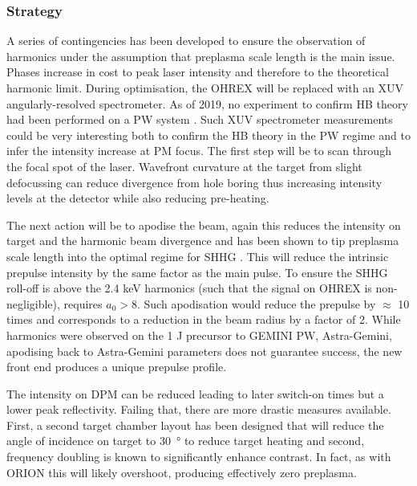 \subsubsection{Strategy}
A series of contingencies has been developed to ensure the observation of harmonics under the assumption that preplasma scale length is the main issue. Phases increase in cost to peak laser intensity and therefore to the theoretical harmonic limit. During optimisation, the OHREX will be replaced with an XUV angularly-resolved spectrometer. As of 2019, no experiment to confirm HB theory had been performed on a PW system \cite{vincentiAchievingExtremeLight2019}. Such XUV spectrometer measurements could be very interesting both to confirm the HB theory in the PW regime and to infer the intensity increase at PM focus. The first step will be to scan through the focal spot of the laser. Wavefront curvature at the target from slight defocussing can reduce divergence from hole boring thus increasing intensity levels at the detector while also reducing pre-heating. 

The next action will be to apodise the beam, again this reduces the intensity on target and the harmonic beam divergence and has been shown to tip preplasma scale length into the optimal regime for SHHG \cite{kahalyDirectObservationDensityGradient2013}. This will reduce the intrinsic prepulse intensity by the same factor as the main pulse. To ensure the SHHG roll-off is above the 2.4 keV harmonics (such that the signal on OHREX is non-negligible), requires $a_0 > 8$. Such apodisation would reduce the prepulse by $\approx$ 10 times and corresponds to a reduction in the beam radius by a factor of 2. While harmonics were observed on the 1 J precursor to GEMINI PW, Astra-Gemini, apodising back to Astra-Gemini parameters does not guarantee success, the new front end produces a unique prepulse profile.

The intensity on DPM can be reduced leading to later switch-on times but a lower peak reflectivity. Failing that, there are more drastic measures available. First, a second target chamber layout has been designed that will reduce the angle of incidence on target to \qty{30}{\degree} to reduce target heating and second, frequency doubling is known to significantly enhance contrast. In fact, as with ORION this will likely overshoot, producing effectively zero preplasma.

